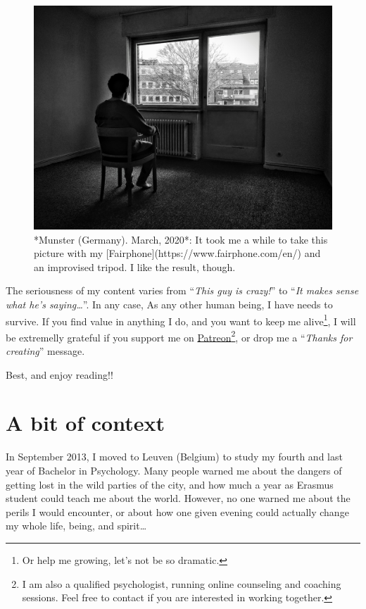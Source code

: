 \documentclass[]{book}
\let\rmarkdownfootnote\footnote%
\def\footnote{\protect\rmarkdownfootnote}
\begin{document}
\begin{figure}

{\centering \includegraphics[width=0.75\linewidth]{images/2014/intro} 

}

\caption{ *Munster (Germany). March, 2020*: It took me a while to take this picture with my [Fairphone](https://www.fairphone.com/en/) and an improvised tripod. I like the result, though.}\label{fig:intro}
\end{figure}

The seriousness of my content varies from ``\emph{This guy is crazy!}'' to ``\emph{It makes sense what he's saying\ldots{}}''. In any case, As any other human being, I have needs to survive. If you find value in anything I do, and you want to keep me alive\footnote{Or help me growing, let's not be so dramatic.}, I will be extremelly grateful if you support me on \href{https://www.patreon.com/carlitofluito}{Patreon}\footnote{I am also a qualified psychologist, running online counseling and coaching sessions. Feel free to contact if you are interested in working together.}, or drop me a ``\emph{Thanks for creating}'' message.

Best, and enjoy reading!!

\hypertarget{context}{%
\section*{A bit of context}\label{context}}

In September 2013, I moved to Leuven (Belgium) to study my fourth and last year of Bachelor in Psychology. Many people warned me about the dangers of getting lost in the wild parties of the city, and how much a year as Erasmus student could teach me about the world. However, no one warned me about the perils I would encounter, or about how one given evening could actually change my whole life, being, and spirit\ldots{}
\end{document}
